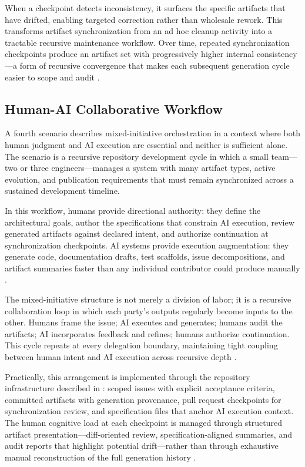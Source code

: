 When a checkpoint detects inconsistency, it surfaces the specific artifacts that have drifted, enabling targeted correction rather than wholesale rework. This transforms artifact synchronization from an ad hoc cleanup activity into a tractable recursive maintenance workflow. Over time, repeated synchronization checkpoints produce an artifact set with progressively higher internal consistency---a form of recursive convergence that makes each subsequent generation cycle easier to scope and audit \cite{Lamport1978TimeClocks,Chandy1985DistributedSnapshots}.

\subsection{Human-AI Collaborative Workflow}

A fourth scenario describes mixed-initiative orchestration in a context where both human judgment and AI execution are essential and neither is sufficient alone. The scenario is a recursive repository development cycle in which a small team---two or three engineers---manages a system with many artifact types, active evolution, and publication requirements that must remain synchronized across a sustained development timeline.

In this workflow, humans provide directional authority: they define the architectural goals, author the specifications that constrain AI execution, review generated artifacts against declared intent, and authorize continuation at synchronization checkpoints. AI systems provide execution augmentation: they generate code, documentation drafts, test scaffolds, issue decompositions, and artifact summaries faster than any individual contributor could produce manually \cite{Amershi2014InteractiveML,Chen2021Codex}.

The mixed-initiative structure is not merely a division of labor; it is a recursive collaboration loop in which each party's outputs regularly become inputs to the other. Humans frame the issue; AI executes and generates; humans audit the artifacts; AI incorporates feedback and refines; humans authorize continuation. This cycle repeats at every delegation boundary, maintaining tight coupling between human intent and AI execution across recursive depth \cite{Shneiderman2020HCAI}.

Practically, this arrangement is implemented through the repository infrastructure described in : scoped issues with explicit acceptance criteria, committed artifacts with generation provenance, pull request checkpoints for synchronization review, and specification files that anchor AI execution context. The human cognitive load at each checkpoint is managed through structured artifact presentation---diff-oriented review, specification-aligned summaries, and audit reports that highlight potential drift---rather than through exhaustive manual reconstruction of the full generation history \cite{Sweller1988CognitiveLoad,Hutchins1995CognitionWild}.

